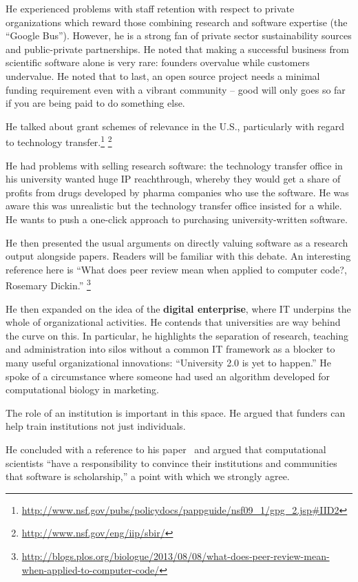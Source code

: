 \documentclass[11pt, oneside]{amsart}
\begin{document}
He experienced problems with staff retention with respect to private
organizations which reward those combining research and software
expertise (the ``Google Bus''). However, he is a strong fan of private
sector sustainability sources and public-private partnerships. He
noted that making a successful business from scientific software alone
is very rare: founders overvalue while customers undervalue. He noted
that to last, an open source project needs a minimal funding
requirement even with a vibrant community -- good will only goes so
far if you are being paid to do something else.

He talked about grant schemes of relevance in the U.S., particularly
with regard to technology
transfer.\footnote{\url{http://www.nsf.gov/pubs/policydocs/pappguide/nsf09_1/gpg_2.jsp\#IID2}} \footnote{\url{http://www.nsf.gov/eng/iip/sbir/}}

He had problems with selling research software: the technology
transfer office in his university wanted huge IP reachthrough, whereby
they would get a share of profits from drugs developed by pharma
companies who use the software. He was aware this was unrealistic but
the technology transfer office insisted for a while. He wants to push
a one-click approach to purchasing university-written software.

He then presented the usual arguments on directly valuing software as a
research output alongside papers. Readers will be familiar with this
debate. An interesting reference here is ``What
does peer review mean when applied to computer code?, Rosemary Dickin.''
\footnote{\url{http://blogs.plos.org/biologue/2013/08/08/what-does-peer-review-mean-when-applied-to-computer-code/}}

He then expanded on the idea of the \textbf{digital enterprise}, where
IT underpins the whole of organizational activities. He contends that
universities are way behind the curve on this. In particular, he
highlights the separation of research, teaching and administration into
silos without a common IT framework as a blocker to many useful
organizational innovations: ``University 2.0 is yet to happen.'' He
spoke of a circumstance where someone had used an algorithm developed
for computational biology in marketing.

The role of an institution is important in this space. He argued that
funders can help train institutions not just individuals.

He concluded with a reference to his paper~\cite{bourne_ten} and
argued that computational scientists ``have a responsibility to
convince their institutions and communities that software is
scholarship,'' a point with which we strongly agree.
\end{document}
